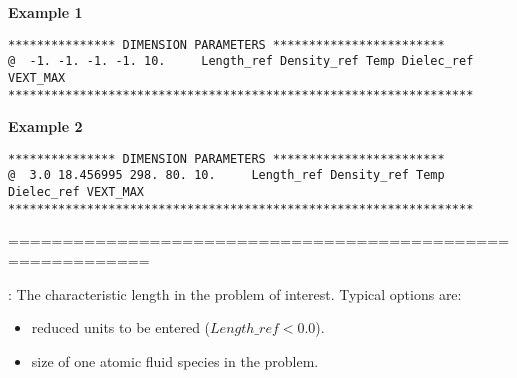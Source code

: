 \documentclass[10pt,onecolumn]{article}
\begin{document}
{\bf Example 1}

\begin{verbatim}
*************** DIMENSION PARAMETERS ************************
@  -1. -1. -1. -1. 10.     Length_ref Density_ref Temp Dielec_ref VEXT_MAX
*****************************************************************
\end{verbatim}

{\bf Example 2}

\begin{verbatim}
*************** DIMENSION PARAMETERS ************************
@  3.0 18.456995 298. 80. 10.     Length_ref Density_ref Temp Dielec_ref VEXT_MAX
*****************************************************************
\end{verbatim}

\noindent===========================================================
\vspace{0.1in}


\vspace{0.1in}
:
The characteristic length in the problem of interest. Typical options are:
\begin{itemize}
\item{reduced units to be entered ($Length\_ref<0.0$).}
\item{size of one atomic fluid species in the problem.}
\end{itemize}
\end{document}
